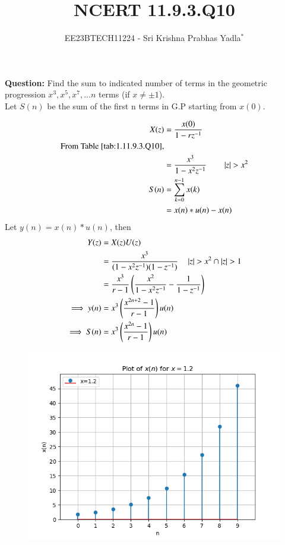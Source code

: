 \documentclass[journal,12pt,twocolumn]{IEEEtran}
\theoremstyle{remark}
\begin{document}

\vspace{3cm}

\title{NCERT 11.9.3.Q10}
\author{EE23BTECH11224 - Sri Krishna Prabhas Yadla$^{*}$%
}
\maketitle
\newpage
\bigskip

\renewcommand{\thefigure}{\arabic{figure}}
\renewcommand{\thetable}{\arabic{table}}


\vspace{3cm}
\textbf{Question:} Find the sum to indicated number of terms in the geometric progression \(x^3,x^5,x^7,...n\) terms (if \(x\neq\pm1\)).
\\
\solution
Let $S(n)$ be the sum of the first n terms in G.P starting from $x(0)$.

\newline
\begin{align}
	X(z) &= \frac{x(0)}{1-rz^{-1}} \\
	\notag \text{From \tabref{tab:1.11.9.3.Q10},} \\
	&= \frac{x^3}{1-x^2z^{-1}} \hspace{0.75cm} |z|>x^2 \\
	S(n) &= \sum_{k=0}^{n-1}x(k) \\
	&= x(n)*u(n) - x(n)
\end{align}
Let $y(n)=x(n)*u(n)$, then
\begin{align}
	Y(z)&=X(z)U(z) \\
	&= \frac{x^3}{(1-x^2z^{-1})(1-z^{-1})} \quad  \left\vert z\right\vert > x^2 \cap \left\vert z\right\vert>1\\
	&= \frac{x^3}{r-1}\left(\frac{x^2}{1-x^2z^{-1}}-\frac{1}{1-z^{-1}}\right) \\
	\implies y(n) &= x^3\left(\frac{x^{2n+2}-1}{r-1}\right)u(n) \\
	\implies S(n) &= x^3\left(\frac{x^{2n}-1}{r-1}\right)u(n)
\end{align}
\begin{figure}[ht!]
	\includegraphics[width=\columnwidth]{figs/plot_2.png}
	\caption{}
	\label{fig:1.2}
\end{figure}
\end{document}
